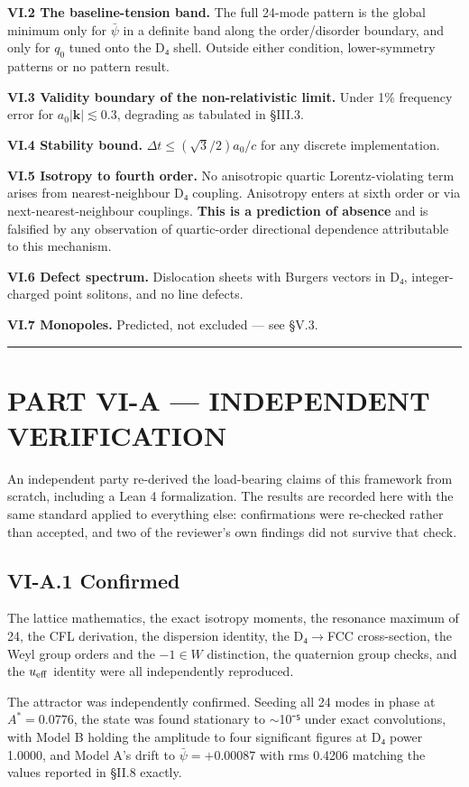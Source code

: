 \documentclass[a4paper,11pt]{article}
\begin{document}
\textbf{VI.2 The baseline-tension band.} The full 24-mode pattern is the global minimum only for $\bar\psi$ in a definite band along the order/disorder boundary, and only for $q_0$ tuned onto the D₄ shell. Outside either condition, lower-symmetry patterns or no pattern result.

\textbf{VI.3 Validity boundary of the non-relativistic limit.} Under 1\% frequency error for $a_0|\mathbf k|\lesssim0.3$, degrading as tabulated in §III.3.

\textbf{VI.4 Stability bound.} $\Delta t\le(\sqrt3/2)a_0/c$ for any discrete implementation.

\textbf{VI.5 Isotropy to fourth order.} No anisotropic quartic Lorentz-violating term arises from nearest-neighbour D₄ coupling. Anisotropy enters at sixth order or via next-nearest-neighbour couplings. \textbf{This is a prediction of absence} and is falsified by any observation of quartic-order directional dependence attributable to this mechanism.

\textbf{VI.6 Defect spectrum.} Dislocation sheets with Burgers vectors in D₄, integer-charged point solitons, and no line defects.

\textbf{VI.7 Monopoles.} Predicted, not excluded — see §V.3.

\medskip\hrule\medskip

\section*{PART VI-A — INDEPENDENT VERIFICATION}

An independent party re-derived the load-bearing claims of this framework from scratch, including a Lean 4 formalization. The results are recorded here with the same standard applied to everything else: confirmations were re-checked rather than accepted, and two of the reviewer's own findings did not survive that check.

\subsection*{VI-A.1 Confirmed}

The lattice mathematics, the exact isotropy moments, the resonance maximum of 24, the CFL derivation, the dispersion identity, the D₄$\to$FCC cross-section, the Weyl group orders and the $-1\in W$ distinction, the quaternion group checks, and the $u_{\rm eff}$ identity were all independently reproduced.

The attractor was independently confirmed. Seeding all 24 modes in phase at $A^* = 0.0776$, the state was found stationary to $\sim$10⁻⁵ under exact convolutions, with Model B holding the amplitude to four significant figures at D₄ power 1.0000, and Model A's drift to $\bar\psi = +0.00087$ with rms 0.4206 matching the values reported in §II.8 exactly.
\end{document}
